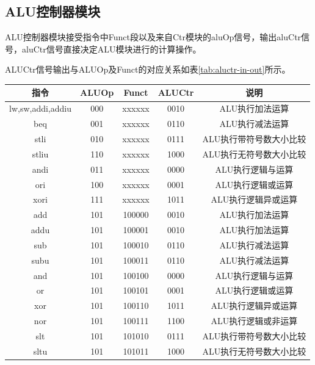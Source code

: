 \documentclass[UTF8]{ctexart}
\begin{document}
\subsection{ALU控制器模块}
    ALU控制器模块接受指令中Funct段以及来自Ctr模块的aluOp信号，输出aluCtr信号，aluCtr信号直接决定ALU模块进行的计算操作。\par
    ALUCtr信号输出与ALUOp及Funct的对应关系如表\ref{tab:aluctr-in-out}所示。
    \begin{table}[htbp]
    \centering
    \begin{tabular}{|c|c|c|c|c|}
    \hline
    指令               & ALUOp & Funct  & ALUCtr & 说明            \\ 
    \hline
    lw,sw,addi,addiu & 000   & xxxxxx & 0010   & ALU执行加法运算     \\
    beq              & 001   & xxxxxx & 0110   & ALU执行减法运算     \\
    stli             & 010   & xxxxxx & 0111   & ALU执行带符号数大小比较 \\
    stliu            & 110   & xxxxxx & 1000   & ALU执行无符号数大小比较 \\
    andi             & 011   & xxxxxx & 0000   & ALU执行逻辑与运算    \\
    ori              & 100   & xxxxxx & 0001   & ALU执行逻辑或运算    \\
    xori             & 111   & xxxxxx & 1011   & ALU执行逻辑异或运算   \\
    add              & 101   & 100000 & 0010   & ALU执行加法运算     \\
    addu             & 101   & 100001 & 0010   & ALU执行加法运算     \\
    sub              & 101   & 100010 & 0110   & ALU执行减法运算     \\
    subu             & 101   & 100011 & 0110   & ALU执行减法运算     \\
    and              & 101   & 100100 & 0000   & ALU执行逻辑与运算    \\
    or               & 101   & 100101 & 0001   & ALU执行逻辑或运算    \\
    xor              & 101   & 100110 & 1011   & ALU执行逻辑异或运算   \\
    nor              & 101   & 100111 & 1100   & ALU执行逻辑或非运算   \\
    slt              & 101   & 101010 & 0111   & ALU执行带符号数大小比较 \\
    sltu             & 101   & 101011 & 1000   & ALU执行无符号数大小比较 \\

\end{tabular}
\end{table}
\end{document}
